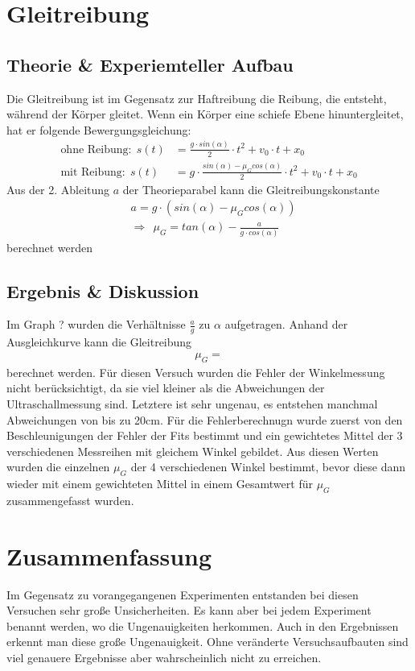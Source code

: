 \documentclass[11pt, a4paper]{article}
\begin{document}
    \section{Gleitreibung}

    \subsection{Theorie \& Experiemteller Aufbau}

    Die Gleitreibung ist im Gegensatz zur Haftreibung die Reibung, die entsteht, während der Körper gleitet.
    Wenn ein Körper eine schiefe Ebene hinuntergleitet, hat er folgende Bewergungsgleichung:
    \begin{align}
        \text{ohne Reibung:} \ \  s(t) &= \frac{g \cdot sin(\alpha)}{2} \cdot t^2 +v_0 \cdot t + x_0 \\
        \text{mit Reibung:} \ \  s(t) &= g \cdot \frac{sin(\alpha) -\mu_G cos(\alpha)}{2} \cdot t^2 +v_0 \cdot t + x_0
    \end{align}
    Aus der 2. Ableitung $a$ der Theorieparabel kann die Gleitreibungskonstante
    \begin{align}
        &a = g \cdot (sin(\alpha) - \mu_G cos(\alpha)) \\
        &\Rightarrow \ \ \mu_G = tan(\alpha) - \frac{a}{g \cdot cos(\alpha)}
    \end{align} 
    berechnet werden

    \subsection{Ergebnis \& Diskussion}
    Im Graph ? wurden die Verhältnisse $\frac{a}{g}$ zu $\alpha$ aufgetragen. Anhand der Ausgleichkurve kann die Gleitreibung
    \begin{align}
        \mu_G = 
    \end{align}
    berechnet werden. Für diesen Versuch wurden die Fehler der Winkelmessung nicht berücksichtigt, da sie viel kleiner als
    die Abweichungen der Ultraschallmessung sind. Letztere ist sehr ungenau, es entstehen manchmal Abweichungen von bis zu 20cm.
     Für die Fehlerberechnugn wurde zuerst von den Beschleunigungen der
    Fehler der Fits bestimmt und ein gewichtetes Mittel der 3 verschiedenen Messreihen mit gleichem Winkel gebildet.
    Aus diesen Werten wurden die einzelnen $\mu_G$ der 4 verschiedenen Winkel bestimmt, bevor diese dann wieder
    mit einem gewichteten Mittel in einem Gesamtwert für $\mu_G$ zusammengefasst wurden.

    \section{Zusammenfassung}

    Im Gegensatz zu vorangegangenen Experimenten entstanden bei diesen Versuchen sehr große Unsicherheiten. Es kann aber 
    bei jedem Experiment benannt werden, wo die Ungenauigkeiten herkommen. Auch in den Ergebnissen erkennt man diese große Ungenauigkeit.
    Ohne veränderte Versuchsaufbauten sind viel genauere Ergebnisse aber wahrscheinlich nicht zu erreichen.

    
    
\end{document}
